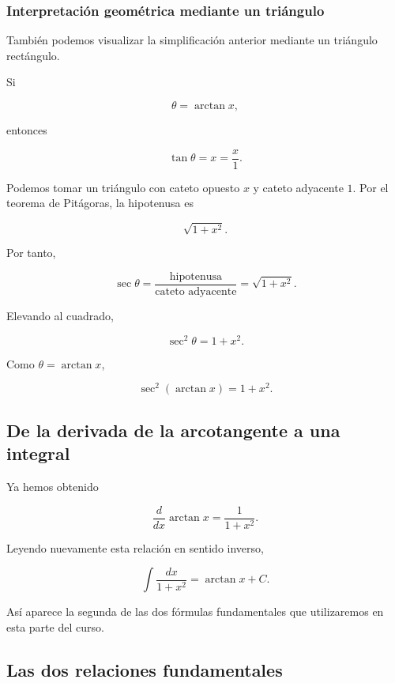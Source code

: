 \documentclass[12pt]{article}
\theoremstyle{definition}
\theoremstyle{remark}
\begin{document}
\subsubsection{Interpretación geométrica mediante un triángulo}

También podemos visualizar la simplificación anterior mediante un
triángulo rectángulo.

Si

\[
\theta=\arctan x,
\]

entonces

\[
\tan\theta=x=\frac{x}{1}.
\]

Podemos tomar un triángulo con cateto opuesto $x$ y cateto adyacente
$1$. Por el teorema de Pitágoras, la hipotenusa es

\[
\sqrt{1+x^2}.
\]

Por tanto,

\[
\sec\theta
=
\frac{\text{hipotenusa}}
     {\text{cateto adyacente}}
=
\sqrt{1+x^2}.
\]

Elevando al cuadrado,

\[
\sec^2\theta=1+x^2.
\]

Como $\theta=\arctan x$,

\[
\sec^2(\arctan x)=1+x^2.
\]

\subsection{De la derivada de la arcotangente a una integral}

Ya hemos obtenido

\[
\frac{d}{dx}\arctan x
=
\frac{1}{1+x^2}.
\]

Leyendo nuevamente esta relación en sentido inverso,

\[
\boxed{
\int\frac{dx}{1+x^2}
=
\arctan x+C.
}
\]

Así aparece la segunda de las dos fórmulas fundamentales que
utilizaremos en esta parte del curso.

\subsection{Las dos relaciones fundamentales}
\end{document}
